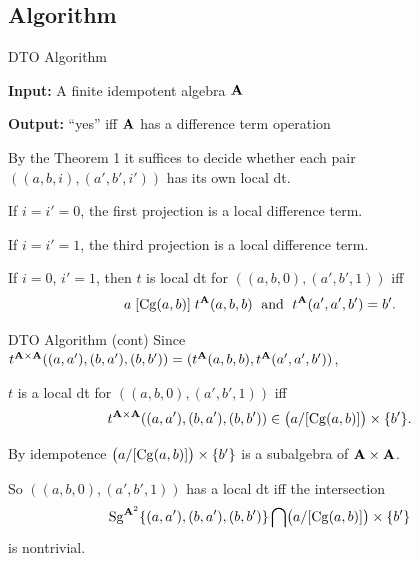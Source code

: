 \documentclass[notes=hide,12pt,xcolor=dvipsnames%
   ]{beamer}
\theoremstyle{definition}
\begin{document}

\subsection{Algorithm}
\label{sec:algor-1}

\begin{frame}[label=algorithm]{DTO Algorithm}

  {\bf Input:} A finite idempotent algebra $\mathbf{A}$

  {\bf Output:} ``yes'' iff $\mathbf{A}$ has a difference term operation

  \pause
  By the Theorem 1 it suffices to decide whether each pair
  $((a,b,i), (a',b',i'))$ %
  has its own local dt.

  \pause
  If $i = i' = 0$, the first projection is a local difference term.

  If $i = i' = 1$, the third projection is a local difference term.

  If $i = 0$, $i'=1$,  then %
  $t$ is local dt for $((a,b,0), (a',b',1))$ iff
  \[
  a\mathrel{[\operatorname{Cg}(a,b)]} t^{\mathbf{A}}(a,b,b) \; \text{ and } \;
  t^{\mathbf{A}}(a',a',b') = b'.
  \]
\end{frame}
\begin{frame}[label=algorithm]{DTO Algorithm (cont)}
  Since
    $t^{\mathbf{A}\times \mathbf{A}}((a,a'), (b,a'), (b,b')) =
    (t^{\mathbf{A}}(a,b,b),t^{\mathbf{A}}(a',a',b'))$,

  $t$ is a local dt for $((a,b,0), (a',b',1))$ iff
  \[
  t^{\mathbf{A}\times \mathbf{A}}((a,a'), (b,a'), (b,b'))\in \bigl(a/[\operatorname{Cg}(a,b)]\bigr) \times \{b'\}.
  \]

  By idempotence $\bigl(a/[\operatorname{Cg}(a,b)]\bigr) \times \{b'\}$ is a subalgebra of $\mathbf{A} \times \mathbf{A}$.

  So $((a,b,0), (a',b',1))$ has a local dt iff the intersection
  \[\operatorname{Sg}^{\mathbf{A}^2}\{(a,a'), (b,a'), (b,b')\} \bigcap
  \bigl(a/[\operatorname{Cg}(a,b)]\bigr) \times \{b'\}\]
  is nontrivial.
\end{frame}
\end{document}
